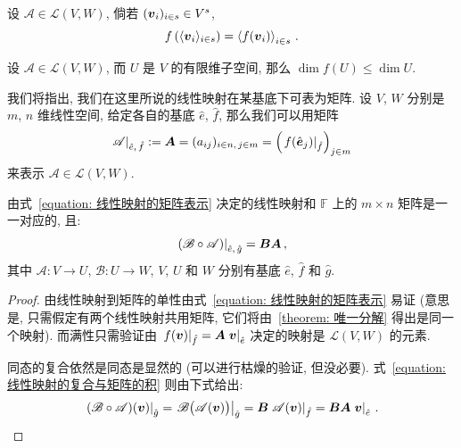 \documentclass[openany, a5paper, oneside]{ctexbook}
\newcommand*{\inbasis}[2]{\left.%
	{#1}\right|_{#2}
}
\begin{document}
\begin{theorem}
	设 $\mathscr A \in \mathcal L (V, W)$, 倘若 $(\boldsymbol{v}_i)_{i \in s} \in V^s$, 
	\begin{equation*}
		f \left( 
			\langle \boldsymbol{v}_i \rangle_{i \in s}
		\right) = \left\langle
			f(\boldsymbol{v}_i)
		\right\rangle_{i \in s}\,.
	\end{equation*} 
\end{theorem}

\begin{corollary}
	设 $\mathscr A \in \mathcal L (V, W)$, 而 $U$ 是 $V$ 的有限维子空间, 那么 $\dim f(U) \leq \dim U$.
\end{corollary}

我们将指出, 我们在这里所说的线性映射在某基底下可表为矩阵. 
设 $V$, $W$ 分别是 $m$, $n$ 维线性空间, 给定各自的基底 $\hat e$, $\hat f$, 那么我们可以用矩阵
\begin{equation}\label{equation: 线性映射的矩阵表示}
	\inbasis{\mathscr A}{\hat e,\, \hat f} 
		:= \bv A = (a_{ij})_{i \in n,\, j \in m}
		= \left( 
			\inbasis{f(\basis e_j)}{\hat f}
		 \right)_{j \in m}
\end{equation}
来表示 $\mathscr A \in \mathcal L (V, W)$. 

\begin{theorem}
	由式~\eqref{equation: 线性映射的矩阵表示} 决定的线性映射和 $\mathbb F$ 上的 $m \times n$ 矩阵是一一对应的, 且:
	\begin{equation}\label{equation: 线性映射的复合与矩阵的积}
		\inbasis{(\mathscr B \circ \mathscr A)}{\hat e,\, \hat g} = \bv B \bv A\,,
	\end{equation}
	其中 $\mathscr A \colon V \to U$, $\mathscr B \colon U \to W$, $V$, $U$ 和 $W$ 分别有基底 $\hat e$, $\hat f$ 和 $\hat g$.
\end{theorem}
\begin{proof}
	由线性映射到矩阵的单性由式~\eqref{equation: 线性映射的矩阵表示} 易证 (意思是, 只需假定有两个线性映射共用矩阵, 它们将由~\ref{theorem: 唯一分解} 得出是同一个映射). 而满性只需验证由 $\inbasis{f(\bv v)}{\hat f} = \bv A \inbasis{\bv v}{\hat e}$ 决定的映射是 $\mathcal L(V, W)$ 的元素.

	同态的复合依然是同态是显然的 (可以进行枯燥的验证, 但没必要). 
	式~\eqref{equation: 线性映射的复合与矩阵的积} 则由下式给出:
	\begin{equation*}
		\inbasis{(\mathscr B \circ \mathscr A)(\bv v)}{\hat g} 
		= \inbasis{\mathscr B \big(
			\mathscr A(\bv v)\big)}{\hat g}
		= \bv B \inbasis{\mathscr A(\bv v)}{\hat f}
		= \bv B \bv A \inbasis{\bv v}{\hat e}\,.
	\end{equation*}
\end{proof}
\end{document}
